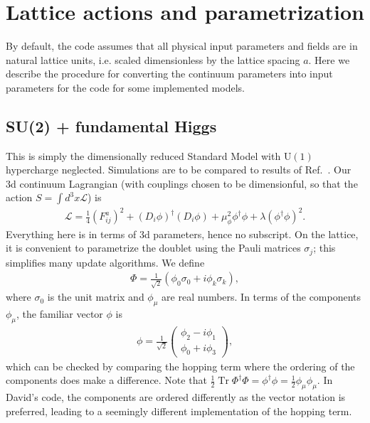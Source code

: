 \documentclass[11pt,a4paper]{article}
\newcommand\Tr{\operatorname{Tr}}
\newcommand\he[1]{#1^\dagger}%
\newcommand\gr[1]{\mathrm{#1}}%
\newcommand\lauri[1]{{\color{myorange}#1}}
\begin{document}
\section{Lattice actions and parametrization}


By default, the code assumes that all physical input parameters and fields are in natural lattice units, i.e. scaled dimensionless by the lattice spacing $a$. Here we describe the procedure for converting the continuum parameters into input parameters for the code for some implemented models. 


\subsection{SU(2) + fundamental Higgs}


This is simply the dimensionally reduced Standard Model with $\gr{U(1)}$ hypercharge neglected. Simulations are to be compared to results of Ref.~\cite{Kajantie:1995kf}. Our 3d continuum Lagrangian (with couplings chosen to be dimensionful, so that the action $S = \int d^3x \mathcal{L}$) is 
\begin{align}
\mathcal{L} = \frac14 (F^a_{ij})^2 + (D_i \phi)^\dagger (D_i \phi) + \mu^2_\phi \phi^\dagger\phi + \lambda (\phi^\dagger\phi)^2.
\end{align}
Everything here is in terms of 3d parameters, hence no subscript. On the lattice, it is convenient to parametrize the doublet using the Pauli matrices $\sigma_j$; this simplifies many update algorithms. We define 
\begin{align}
\label{eq:Higgsfield}
\Phi = \frac{1}{\sqrt{2}} (\phi_0 \sigma_0 + i \phi_k \sigma_k ), 
\end{align}
where $\sigma_0$ is the unit matrix and $\phi_\mu$ are real numbers. In terms of the components $\phi_\mu$, the familiar vector $\phi$ is 
\begin{align}
\phi = \frac{1}{\sqrt{2}} 
\begin{pmatrix}
\phi_2 - i \phi_1 \\
\phi_0 + i \phi_3 
\end{pmatrix},
\end{align}
which can be checked by comparing the hopping term where the ordering of the components does make a difference. Note that $\frac12 \Tr \he\Phi\Phi = \he\phi\phi = \frac12 \phi_\mu \phi_\mu$. \lauri{In David's code, the components are ordered differently as the vector notation is preferred, leading to a seemingly different implementation of the hopping term.}
\end{document}
